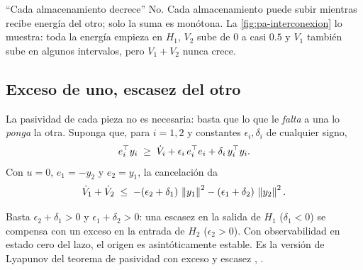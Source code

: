 \begin{trampa}[label=tr:pa-cadauno]{``Cada almacenamiento decrece''}
No. Cada almacenamiento puede subir mientras recibe energía del otro; solo la suma es monótona. La \cref{fig:pa-interconexion} lo muestra: toda la energía empieza en $H_1$, $V_2$ sube de $0$ a casi $0.5$ y $V_1$ también sube en algunos intervalos, pero $V_1+V_2$ nunca crece.
\end{trampa}

\subsection{Exceso de uno, escasez del otro}

La pasividad de cada pieza no es necesaria: basta que lo que le \emph{falta} a una lo \emph{ponga} la otra. Suponga que, para $i=1,2$ y constantes $\epsilon_i,\delta_i$ de cualquier signo,
\begin{equation}
  e_i^{\top} y_i\;\ge\;\dot V_i+\epsilon_i\,e_i^{\top} e_i+\delta_i\,y_i^{\top} y_i .
  \label{eq:pa-excesoescasez}
\end{equation}
Con $u=0$, $e_1=-y_2$ y $e_2=y_1$, la cancelación da
\begin{equation}
  \dot V_1+\dot V_2\;\le\;-(\epsilon_2+\delta_1)\,\left\lVert y_1\right\rVert^2-(\epsilon_1+\delta_2)\,\left\lVert y_2\right\rVert^2 .
  \label{eq:pa-compensa}
\end{equation}

\begin{ideaclave}
Basta $\epsilon_2+\delta_1>0$ y $\epsilon_1+\delta_2>0$: una escasez en la salida de $H_1$ ($\delta_1<0$) se compensa con un exceso en la entrada de $H_2$ ($\epsilon_2>0$). Con observabilidad en estado cero del lazo, el origen es asintóticamente estable. Es la versión de Lyapunov del teorema de pasividad con exceso y escasez \citep[\S6.5]{Kha02}, \citep[cap.~2]{SJK97}.
\end{ideaclave}


